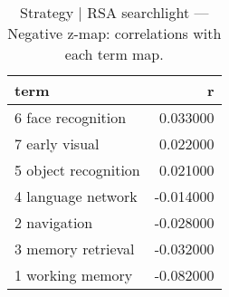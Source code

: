 \begin{table}
\caption{Strategy | RSA searchlight — Negative z-map: correlations with each term map.}
\label{tab:Strategy | RSA searchlight_neg}
\begin{tabular}{lr}
\toprule
term & r \\
\midrule
6 face recognition & 0.033000 \\
7 early visual & 0.022000 \\
5 object recognition & 0.021000 \\
4 language network & -0.014000 \\
2 navigation & -0.028000 \\
3 memory retrieval & -0.032000 \\
1 working memory & -0.082000 \\
\bottomrule
\end{tabular}
\end{table}
